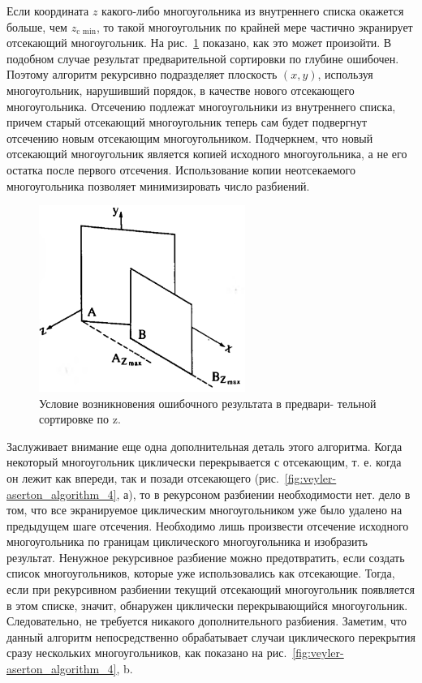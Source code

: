 Если координата \(z\) какого-либо многоугольника из внутреннего списка окажется больше, чем \( z_{\text{c min}} \), то такой многоугольник по крайней мере частично экранирует отсекающий многоугольник. На рис.~\ref{fig:veyler-aserton_algorithm_3} показано, как это может произойти. В подобном случае результат предварительной сортировки по глубине ошибочен. Поэтому алгоритм рекурсивно подразделяет плоскость \( (x, y) \), используя многоугольник, нарушивший порядок, в качестве нового отсекающего многоугольника. Отсечению подлежат многоугольники из внутреннего списка, причем старый отсекающий многоугольник теперь сам будет подвергнут отсечению новым отсекающим многоугольником. Подчеркнем, что новый отсекающий многоугольник является копией исходного многоугольника, а не его остатка после первого отсечения. Использование копии неотсекаемого многоугольника позволяет минимизировать число разбиений.

\begin{figure}[H]
    \centering
    \includegraphics[width=0.6\textwidth]{img/veyler-aserton_algorithm_3.png}
    \caption{Условие возникновения
ошибочного результата в предвари-
тельной сортировке по z.}
    \label{fig:veyler-aserton_algorithm_3}
\end{figure}

Заслуживает внимание еще одна дополнительная деталь этого алгоритма. Когда некоторый многоугольник циклически перекрывается с отсекающим, т. е. когда он лежит как впереди, так и позади отсекающего (рис.~\ref{fig:veyler-aserton_algorithm_4}, а), то в рекурсоном разбиении необходимости нет. дело в том, что все экранируемое циклическим многоугольником уже было удалено на предыдущем шаге отсечения. Необходимо лишь произвести отсечение исходного многоугольника по границам циклического многоугольника и изобразить результат. Ненужное рекурсивное разбиение можно предотвратить, если создать список многоугольников, которые уже использовались как отсекающие. Тогда, если при рекурсивном разбиении текущий отсекающий многоугольник появляется в этом списке, значит, обнаружен циклически перекрывающийся многоугольник. Следовательно, не требуется никакого дополнительного разбиения. Заметим, что данный алгоритм непосредственно обрабатывает случаи циклического перекрытия сразу нескольких многоугольников, как показано на рис.~\ref{fig:veyler-aserton_algorithm_4}, b.~\cite{rodgers}

